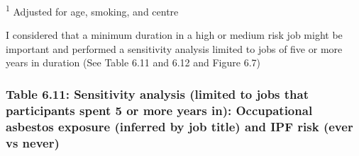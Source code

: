 \textsuperscript{1} Adjusted for age, smoking, and centre

I considered that a minimum duration in a high or medium risk job might
be important and performed a sensitivity analysis limited to jobs of
five or more years in duration (See Table 6.11 and 6.12 and Figure 6.7)

\hypertarget{table-6.11-sensitivity-analysis-limited-to-jobs-that-participants-spent-5-or-more-years-in-occupational-asbestos-exposure-inferred-by-job-title-and-ipf-risk-ever-vs-never}{%
\subsubsection{Table 6.11: Sensitivity analysis (limited to jobs that
participants spent 5 or more years in): Occupational asbestos exposure
(inferred by job title) and IPF risk (ever vs
never)}\label{table-6.11-sensitivity-analysis-limited-to-jobs-that-participants-spent-5-or-more-years-in-occupational-asbestos-exposure-inferred-by-job-title-and-ipf-risk-ever-vs-never}}

